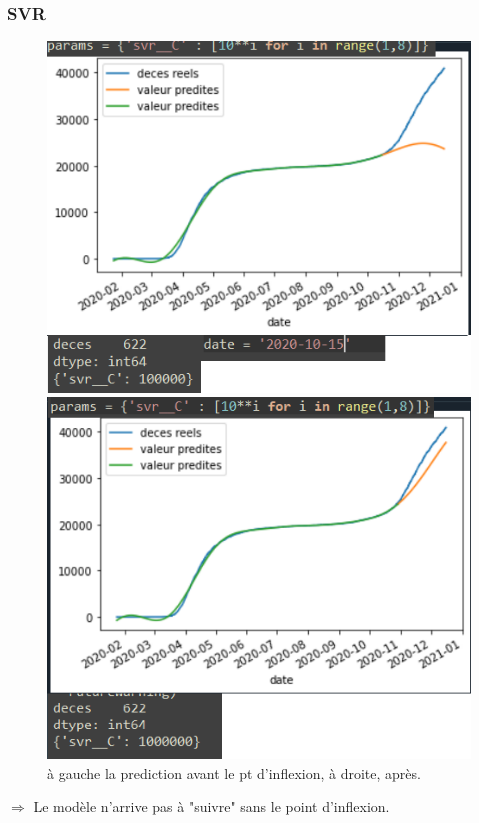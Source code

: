 \documentclass{beamer}
\begin{document}
\begin{frame}
	\frametitle{SVR}
	\begin{figure}[t]
		\centering
		\begin{minipage}{0.4\textwidth}
			\includegraphics[scale=0.25]{SVR_avant_pt_dinflexion}
		\end{minipage}
		\begin{minipage}{0.4\textwidth}
			\includegraphics[scale=0.25]{SVR_apres_pt_dinflexion}
		\end{minipage}
	\caption{à gauche la prediction avant le pt d'inflexion, à droite, après.}
	\end{figure}
	$\Rightarrow$ Le modèle n'arrive pas à "suivre" sans le point d'inflexion.
\end{frame}
\end{document}
